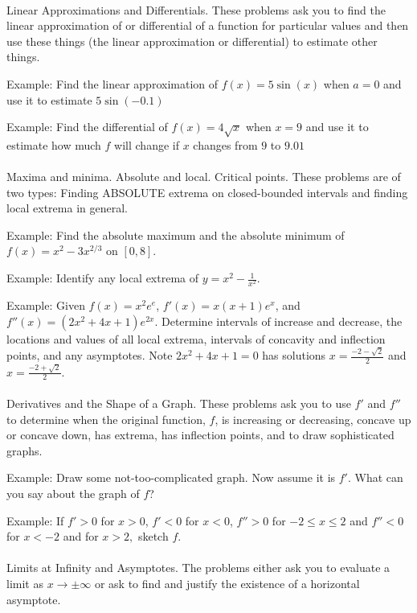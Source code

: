 \documentclass[11pt,fleqn]{article}
\begin{document}
\noindent {}\\
Linear Approximations and Differentials. These problems ask you to find the linear approximation of or differential of a function for particular values and then use these things (the linear approximation or differential) to estimate other things.

Example:  Find the linear approximation of $f(x)=5 \sin (x)$ when $a=0$ and use it to estimate $5 \sin (-0.1)$

Example:  Find the differential of $f(x)=4 \sqrt{x}$ when $x=9$ and use it to estimate  how much $f$ will change if $x$ changes from $9$ to $9.01$\\



\noindent {}\\
Maxima and minima. Absolute and local. Critical points. These problems are of two types: Finding ABSOLUTE extrema on closed-bounded intervals and finding local extrema in general.

Example: Find the absolute maximum and the absolute minimum of $f(x)=x^2-3x^{2/3}$ on $[0,8].$

Example: Identify any local extrema of $y=x^2- \frac{1}{x^2}.$

Example: Given $f(x)=x^2e^e$, $f'(x)=x(x+1)e^x$, and $f''(x)=(2x^2+4x+1)e^{2x}$. Determine intervals of increase and decrease, the locations and values of all local extrema, intervals of concavity and inflection points, and any asymptotes. Note $2x^2+4x+1=0$ has solutions $x=\frac{-2-\sqrt{2}}{2}$ and $x=\frac{-2+\sqrt{2}}{2}.$\\

\noindent {}\\
Derivatives and the Shape of a Graph. These problems ask you to use $f'$ and $f''$ to determine when the original function, $f$, is increasing or decreasing, concave up or concave down, has extrema, has inflection points, and to draw sophisticated graphs.

Example: Draw some not-too-complicated graph. Now assume it is $f'$. What can you say about the graph of $f$?

Example: If $f' >0$ for $x>0$, $f' <0$ for $x<0$, $f'' > 0$ for $-2 \leq x \leq 2$ and $f'' < 0$ for $x<-2$ and for $x>2,$ sketch $f.$\\

\noindent {}\\
Limits at Infinity and Asymptotes. The problems either ask you to evaluate a limit as $x \to \pm \infty$ or ask to find and justify the existence of a  horizontal asymptote.
\end{document}
